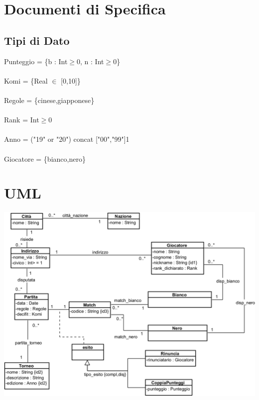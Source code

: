 \documentclass[12pt, letterpaper]{article}
\newcommand{\acc}{\\\hphantom{}\\}
\begin{document}
\section{Documenti di Specifica}
\subsection{Tipi di Dato}
Punteggio = \{b : Int$\ge$0, n : Int$\ge$0\}\acc 
Komi = \{Real $\in$ [0,10]\}\acc 
Regole = \{cinese,giapponese\}\acc
Rank = Int$\ge$0\acc 
Anno = ("19" or "20") concat ["00","99"]{1}\acc
Giocatore = \{bianco,nero\}
\section{UML}
\begin{center}
    \includegraphics[width=\textwidth]{images/VPP.png}
\end{center}
\end{document}
